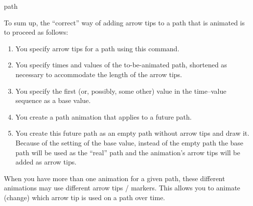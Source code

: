\begin{sysanimateattribute}{path}
\begin{command}{\pgfsys@animation@tip@markers{}}
        To sum up, the ``correct'' way of adding arrow tips to a path that is
        animated is to proceed as follows:
        \begin{enumerate}
            \item You specify arrow tips for a path using this command.
            \item You specify times and values of the to-be-animated path,
                shortened as necessary to accommodate the length of the arrow
                tips.
            \item You specify the first (or, possibly, some other) value in the
                time--value sequence as a base value.
            \item You create a path animation that applies to a future path.
            \item You create this future path as an empty path without arrow
                tips and draw it. Because of the setting of the base value,
                instead of the empty path the base path will be used as the
                ``real'' path and the animation's arrow tips will be added as
                arrow tips.
        \end{enumerate}

        When you have more than one animation for a given path, these different
        animations may use different arrow tips / markers. This allows you to
        animate (change) which arrow tip is used on a path over time.
\begin{codeexample}[
    preamble={\usetikzlibrary{animations}},
    animation list={0.5,1,1.5,2},
    animation bb={(0.7,-0.3)rectangle(2.3,1.3)},
]
\pgfsys@marker@declare{}%
\end{codeexample}
    \end{command}
\end{sysanimateattribute}


